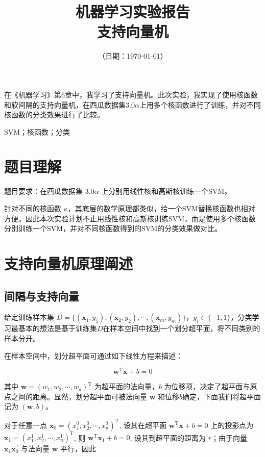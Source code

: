 \documentclass{ctexart}
\title{\textbf{机器学习实验报告\\{\Large{支持向量机}}}} %
\author{\sffamily{朱天泽}} %
\date{（日期：\today）} %
\begin{document}
	\maketitle
	在《机器学习》第6章中，我学习了支持向量机。此次实验，我实现了使用核函数和软间隔的支持向量机，在西瓜数据集$3.0\alpha$上用多个核函数进行了训练，并对不同核函数的分类效果进行了比较。
	
	 SVM；核函数；分类
	
	\section{题目理解}
	题目要求：在西瓜数据集 $3.0\alpha$ 上分别用线性核和高斯核训练一个SVM。
	
	针对不同的核函数 $\kappa$，其底层的数学原理都类似，给一个SVM替换核函数也相对方便。因此本次实验计划不止用线性核和高斯核训练SVM，而是使用多个核函数分别训练一个SVM，并对不同核函数得到的SVM的分类效果做对比。
	\section{支持向量机原理阐述}
	\subsection{间隔与支持向量}
	给定训练样本集 $D=\{(\bm{x}_1,y_1),(\bm{x}_2,y_2),\cdots,(\bm{x}_m,y_m)\}$，$y_i\in\{-1,1\}$，分类学习最基本的想法是基于训练集$D$在样本空间中找到一个划分超平面，将不同类别的样本分开。
	
	在样本空间中，划分超平面可通过如下线性方程来描述：
	
	\begin{equation}
		\boldsymbol{w}^{\mathrm{T}} \boldsymbol{x}+b=0
	\end{equation}

	其中 $\boldsymbol{w}=(w_1,w_2,\cdots,w_d)^{\mathrm{T}}$ 为超平面的法向量，$b$ 为位移项，决定了超平面与原点之间的距离。显然，划分超平面可被法向量 $\boldsymbol{w}$ 和位移$b$确定，下面我们将超平面记为 $(\boldsymbol{w},b)$。
	
	对于任意一点 $\boldsymbol{x}_{0}=\left(x_{1}^{0}, x_{2}^{0}, \cdots, x_{n}^{0}\right)^{\mathrm{T}}$, 设其在超平面 $\boldsymbol{w}^{\mathrm{T}} \boldsymbol{x}+b=0$ 上的投影点为 $\boldsymbol{x}_{1}=\left(x_{1}^{1}, x_{2}^{1}, \cdots, x_{n}^{1}\right)^{\mathrm{T}}$, 则 $\boldsymbol{w}^{\mathrm{T}} \boldsymbol{x}_{1}+b=0$, 设其到超平面的距离为 $r$；由于向量 $\overrightarrow{\boldsymbol{x}_{1} \boldsymbol{x}_{0}}$ 与法向量 $\boldsymbol{w}$ 平行，因此
	
\end{document}
